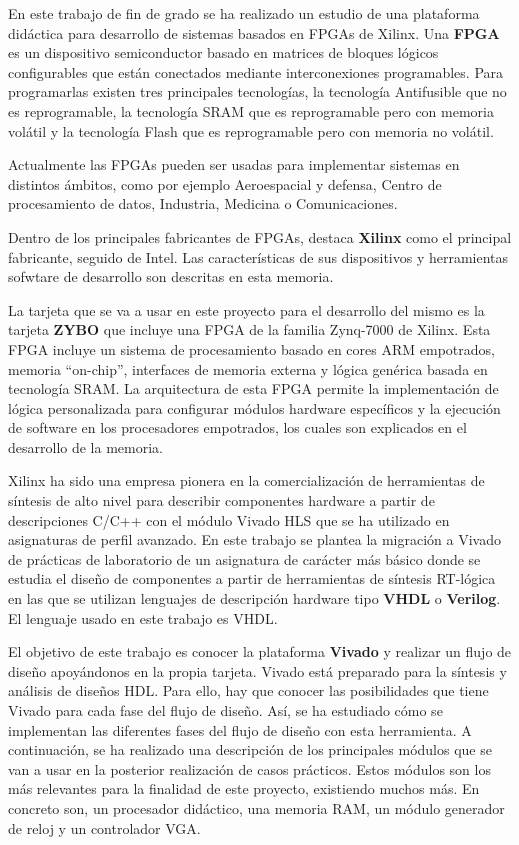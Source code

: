 En este trabajo de fin de grado se ha realizado un estudio de una plataforma didáctica para desarrollo de sistemas basados en FPGAs de Xilinx. 
Una \textbf{FPGA} es un dispositivo semiconductor basado en matrices de bloques lógicos configurables que están conectados mediante interconexiones programables. 
Para programarlas existen tres principales tecnologías, la tecnología Antifusible que no es reprogramable, la tecnología SRAM que es reprogramable 
pero con memoria volátil y la tecnología Flash que es reprogramable pero con memoria no volátil. 

Actualmente las FPGAs pueden ser usadas para implementar sistemas en distintos ámbitos, como por ejemplo Aeroespacial y defensa, 
Centro de procesamiento de datos, Industria, Medicina o Comunicaciones.

Dentro de los principales fabricantes de FPGAs, destaca \textbf{Xilinx} como el principal fabricante, seguido de Intel. Las características de sus dispositivos 
y herramientas sofwtare de desarrollo son descritas en esta memoria.

La tarjeta que se va a usar en este proyecto para el desarrollo del mismo es la tarjeta \textbf{ZYBO} que incluye una FPGA de la familia Zynq-7000 de Xilinx. Esta FPGA incluye 
un sistema de procesamiento basado en cores ARM empotrados, memoria ``on-chip'', interfaces de memoria externa y lógica genérica basada en tecnología SRAM. La arquitectura 
de esta FPGA permite la implementación de lógica personalizada para configurar módulos hardware específicos y la ejecución de software en los procesadores empotrados, los cuales 
son explicados en el desarrollo de la memoria. 

Xilinx ha sido una empresa pionera en la comercialización de herramientas de síntesis de alto nivel para describir componentes hardware a partir de descripciones C/C++ 
con el módulo Vivado HLS que se ha utilizado en asignaturas de perfil avanzado. En este trabajo se plantea la migración a Vivado de prácticas de laboratorio 
de un asignatura de carácter más básico donde se estudia el diseño de componentes a partir de herramientas de síntesis RT-lógica en las que se utilizan lenguajes 
de descripción hardware tipo \textbf{VHDL} o \textbf{Verilog}. El lenguaje usado en este trabajo es VHDL.

El objetivo de este trabajo es conocer la plataforma \textbf{Vivado} y realizar un flujo de diseño apoyándonos en la propia tarjeta. Vivado está preparado 
para la síntesis y análisis de diseños HDL. Para ello, hay que conocer las posibilidades que tiene Vivado para cada fase del flujo de diseño. Así, se ha estudiado cómo 
se implementan las diferentes fases del flujo de diseño con esta herramienta. A continuación, se ha realizado una descripción de los principales módulos que se van a 
usar en la posterior realización de casos prácticos. Estos módulos son los más relevantes para la finalidad de este proyecto, existiendo muchos más. En concreto son, 
un procesador didáctico, una memoria RAM, un módulo generador de reloj y un controlador VGA.

